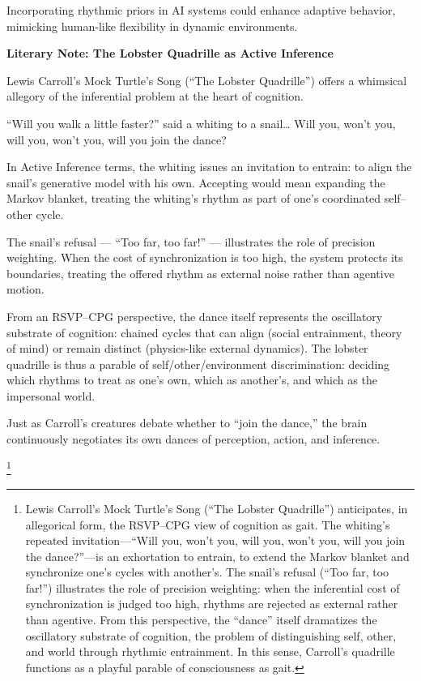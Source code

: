 \documentclass{article}
\begin{document}
Incorporating rhythmic priors in AI systems could enhance adaptive behavior, mimicking human-like flexibility in dynamic environments.

\begin{boxedminipage}{\textwidth}
\textbf{Literary Note: The Lobster Quadrille as Active Inference}

Lewis Carroll’s Mock Turtle’s Song (“The Lobster Quadrille”) offers a whimsical allegory of the inferential problem at the heart of cognition.

“Will you walk a little faster?” said a whiting to a snail… Will you, won’t you, will you, won’t you, will you join the dance?

In Active Inference terms, the whiting issues an invitation to entrain: to align the snail’s generative model with his own. Accepting would mean expanding the Markov blanket, treating the whiting’s rhythm as part of one’s coordinated self–other cycle.

The snail’s refusal — “Too far, too far!” — illustrates the role of precision weighting. When the cost of synchronization is too high, the system protects its boundaries, treating the offered rhythm as external noise rather than agentive motion.

From an RSVP–CPG perspective, the dance itself represents the oscillatory substrate of cognition: chained cycles that can align (social entrainment, theory of mind) or remain distinct (physics-like external dynamics). The lobster quadrille is thus a parable of self/other/environment discrimination: deciding which rhythms to treat as one’s own, which as another’s, and which as the impersonal world.

Just as Carroll’s creatures debate whether to “join the dance,” the brain continuously negotiates its own dances of perception, action, and inference.
\end{boxedminipage}

\footnote{Lewis Carroll’s Mock Turtle’s Song (“The Lobster Quadrille”) anticipates, in allegorical form, the RSVP–CPG view of cognition as gait. The whiting’s repeated invitation—“Will you, won’t you, will you, won’t you, will you join the dance?”—is an exhortation to entrain, to extend the Markov blanket and synchronize one’s cycles with another’s. The snail’s refusal (“Too far, too far!”) illustrates the role of precision weighting: when the inferential cost of synchronization is judged too high, rhythms are rejected as external rather than agentive. From this perspective, the “dance” itself dramatizes the oscillatory substrate of cognition, the problem of distinguishing self, other, and world through rhythmic entrainment. In this sense, Carroll’s quadrille functions as a playful parable of consciousness as gait.}
\end{document}

